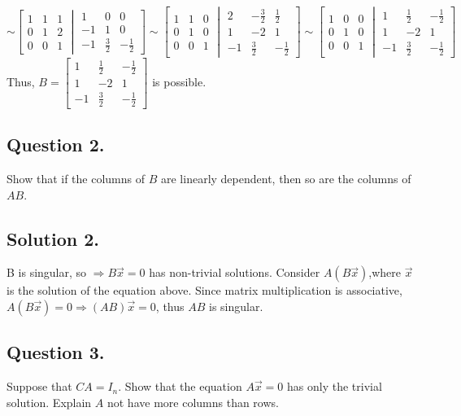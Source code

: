 \documentclass{article}
\begin{document}
\[\sim\left[\begin{array}{ccc}1&1&1\\0&1&2\\0&0&1\end{array}\middle\vert\begin{array}{ccc}1&0&0\\-1&1&0\\-1&\frac{3}{2}&-\frac{1}{2}\end{array}\right]
\sim\left[\begin{array}{ccc}1&1&0\\0&1&0\\0&0&1\end{array}\middle\vert\begin{array}{ccc}2&-\frac{3}{2}&\frac{1}{2}\\1&-2&1\\-1&\frac{3}{2}&-\frac{1}{2}\end{array}\right]
\sim\left[\begin{array}{ccc}1&0&0\\0&1&0\\0&0&1\end{array}\middle\vert\begin{array}{ccc}1&\frac{1}{2}&-\frac{1}{2}\\1&-2&1\\-1&\frac{3}{2}&-\frac{1}{2}\end{array}\right]\]
Thus, $B=\left[\begin{array}{ccc}1&\frac{1}{2}&-\frac{1}{2}\\1&-2&1\\-1&\frac{3}{2}&-\frac{1}{2}\end{array}\right]$ is possible.
\subsection*{Question 2.}
Show that if the columns of $B$ are linearly dependent, then so are the columns of $AB$.
\subsection*{Solution 2.}
B is singular, so $\Rightarrow B\Vec{x}=0$ has non-trivial solutions.\newline
Consider $A(B\Vec{x})$,where $\Vec{x}$ is the solution of the equation above. Since matrix multiplication is associative, $A(B\Vec{x})=0\Rightarrow (AB)\Vec{x}=0$, thus $AB$ is singular. 
\subsection*{Question 3.}
Suppose that $CA=I_n$. Show that the equation $A\Vec{x}= 0$ has only the trivial solution. Explain $A$ not have more columns than rows.
\end{document}
